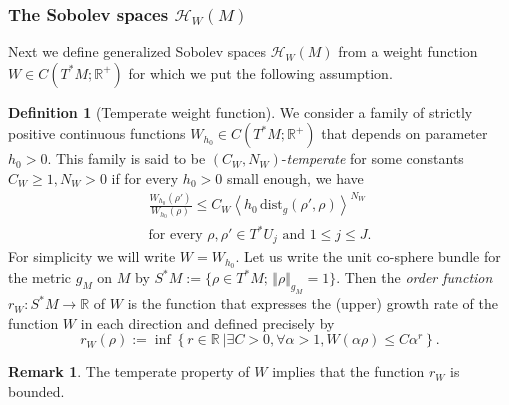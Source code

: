 \documentclass[10pt]{amsart}
\theoremstyle{definition}\newtheorem{defi}[theo]{Definition}\newtheorem{rema}[theo]{Remark}\newtheorem{exam}[theo]{Example}\newtheorem{exem}[theo]{Example}\newtheorem{nota}[theo]{Notation}
\newcommand{\clH}{\mathcal{H}}
\newcommand{\dist}{\mathrm{dist}}
\newcommand{\bbR}{\mathbb{R}}
\let\oldexists\exists
\renewcommand*{\exists}{\mathrel{\oldexists}}
\let\oldforall\forall
\renewcommand*{\forall}{\mathrel{\oldforall}}
\begin{document}
\subsubsection{The Sobolev spaces \texorpdfstring{$\clH _{W}(M)$}{HW(M)}}\label{subsec:Sobolev-space}

Next we define generalized Sobolev spaces $\clH _{W}(M)$ from a weight function $W\in C(T^{*}M;\bbR^{+})$ for which we put the following assumption.

\begin{cBoxA}{}
\begin{defi}[Temperate weight function]\label{def:temperate_W-1}
We consider a family of strictly positive continuous functions $W_{h_{0}}\in C(T^{*}M;\bbR^{+})$ that depends on parameter $h_{0}>0$. This family is said to be $(C_{W},N_{W})$-\emph{temperate} for some constants $C_{W}\geq1,N_{W}>0$ if for every $h_{0}>0$ small enough, we have
\begin{multline}\label{eq:temperate_property-W-2}
\frac{W_{h_{0}}\left(\rho'\right)}{W_{h_{0}}\left(\rho\right)}\leq C_{W}\left\langle h_{0}\,\dist_{g}\left(\rho',\rho\right)\right\rangle ^{N_{W}}
\\
\text{for every }\rho,\rho'\in T^{*}U_{j}\text{ and }1\le j\le J.
\end{multline}
For simplicity we will write $W=W_{h_{0}}$. Let us write the unit co-sphere bundle for the metric $g_{M}$ on $M$ by $S^{*}M:=\{ \rho\in T^{*}M;\,\Vert \rho\Vert _{g_{M}}=1\} $. Then the \emph{order function} $r_{W}:S^{*}M\to\bbR$ of $W$ is the function that expresses the (upper) growth rate of the function $W$ in each direction and defined precisely by
\begin{equation}\label{eq:def_order-2}
r_{W}\left(\rho\right):=\inf\left\{ r\in\bbR\:\mid\exists C>0,\forall\alpha>1,W\left(\alpha\rho\right)\leq C\alpha^{r}\right\}.
\end{equation}
\end{defi}
\end{cBoxA}

\begin{rema}
The temperate property of $W$ implies that the function $r_{W}$ is bounded.
\end{rema}
\end{document}

